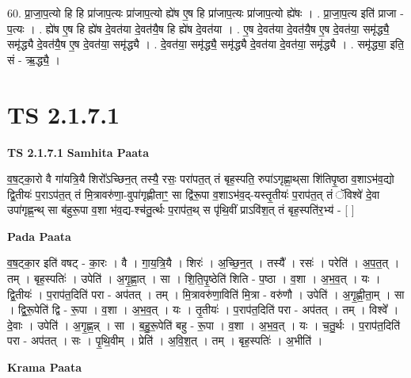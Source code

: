 \documentclass[17pt]{extarticle}
\begin{document}
60. प्रा॒जा॒प॒त्यो हि हि प्रा॑जाप॒त्यः प्रा॑जाप॒त्यो ह्ये॑ष ए॒ष हि प्रा॑जाप॒त्यः प्रा॑जाप॒त्यो ह्ये॑षः । . प्रा॒जा॒प॒त्य इति॑ प्राजा - प॒त्यः । . ह्ये॑ष ए॒ष हि ह्ये॑ष दे॒वत॑या दे॒वत॑यै॒ष हि ह्ये॑ष दे॒वत॑या । . ए॒ष दे॒वत॑या दे॒वत॑यै॒ष ए॒ष दे॒वत॑या॒ समृ॑द्ध्यै॒ समृ॑द्ध्यै दे॒वत॑यै॒ष ए॒ष दे॒वत॑या॒ समृ॑द्ध्यै । . दे॒वत॑या॒ समृ॑द्ध्यै॒ समृ॑द्ध्यै दे॒वत॑या दे॒वत॑या॒ समृ॑द्ध्यै । . समृ॑द्ध्या॒ इति॒ सं - ऋ॒द्ध्यै॒ । \newline
\pagebreak
{}
\section*{ TS 2.1.7.1 }

\textbf{TS 2.1.7.1 } \newline
\textbf{Samhita Paata} \newline

व॒ष॒ट्का॒रो वै गा॑यत्रि॒यै शिरो᳚ऽच्छिन॒त् तस्यै॒ रसः॒ परा॑पत॒त् तं बृह॒स्पति॒ रुपा॑ऽगृह्णा॒थ्‌सा शि॑तिपृ॒ष्ठा व॒शाऽभ॑व॒द्यो द्वि॒तीयः॑ प॒राऽप॑त॒त् तं मि॒त्रावरु॑णा॒-वुपा॑गृह्णीताꣳ॒॒ सा द्वि॑रू॒पा व॒शाऽभ॑व॒द्-यस्तृ॒तीयः॑ प॒राप॑त॒त् तं ॅविश्वे॑ दे॒वा उपा॑गृह्ण॒न्थ् सा ब॑हुरू॒पा व॒शा भ॑व॒द्य-श्च॑तु॒र्त्थः प॒राप॑त॒थ् स पृ॑थि॒वीं प्राऽवि॑श॒त् तं बृह॒स्पति॑र॒भ्य॑ - [  ] \newline

\textbf{Pada Paata} \newline

व॒ष॒ट्का॒र इति॑ वषट् - का॒रः । वै । गा॒य॒त्रि॒यै । शिरः॑ । अ॒च्छि॒न॒त् । तस्यै᳚ । रसः॑ । परेति॑ । अ॒प॒त॒त् । तम् । बृह॒स्पतिः॑ । उपेति॑ । अ॒गृ॒ह्णा॒त् । सा । शि॒ति॒पृ॒ष्ठेति॑ शिति - प॒ष्ठा । व॒शा । अ॒भ॒व॒त् । यः । द्वि॒तीयः॑ । प॒राप॑त॒दिति॑ परा - अप॑तत् । तम् । मि॒त्रावरु॑णा॒विति॑ मि॒त्रा - वरु॑णौ । उपेति॑ । अ॒गृ॒ह्णी॒ता॒म् । सा । द्वि॒रू॒पेति॑ द्वि - रू॒पा । व॒शा । अ॒भ॒व॒त् । यः । तृ॒तीयः॑ । प॒राप॑त॒दिति॑ परा - अप॑तत् । तम् । विश्वे᳚ । दे॒वाः । उपेति॑ । अ॒गृ॒ह्ण॒न्न् । सा । ब॒हु॒रू॒पेति॑ बहु - रू॒पा । व॒शा । अ॒भ॒व॒त् । यः । च॒तु॒र्थः । प॒राप॑त॒दिति॑ परा - अप॑तत् । सः । पृ॒थि॒वीम् । प्रेति॑ । अ॒वि॒श॒त् । तम् । बृह॒स्पतिः॑ । अ॒भीति॑ ।  \newline


\textbf{Krama Paata} \newline
\end{document}
